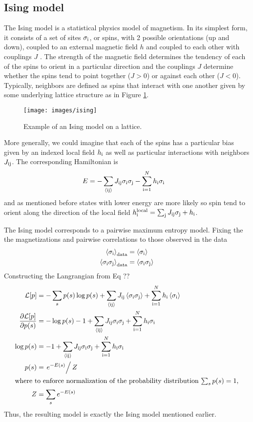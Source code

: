 \documentclass[aps,prl,twocolumn]{revtex4-1}
\begin{document}
\subsection{Ising model}
The Ising model is a statistical physics model of magnetism. In its simplest form, it consists of a set of sites $\sigma_{\rm i}$, or spins, with 2 possible orientations (up and down), coupled to an external magnetic field $h$ and coupled to each other with couplings $J$ \cite{Reif:2009uf}. The strength of the magnetic field determines the tendency of each of the spins to orient in a particular direction and the couplings $J$ determine whether the spins tend to point together ($J>0$) or against each other ($J<0$). Typically, neighbors are defined as spins that interact with one another given by some underlying lattice structure as in Figure \ref{gr:ising}.

\begin{figure}[htbp]\centering
	\texttt{[image: images/ising]}
\caption{Example of an Ising model on a lattice.}
\label{gr:ising}
\end{figure}

More generally, we could imagine that each of the spins has a particular bias given by an indexed local field $h_{\rm i}$ as well as particular interactions with neighbors $J_{\rm ij}$. The corresponding Hamiltonian is
\begin{align}
	E &= -\sum_{\rm \left<ij\right>} J_{\rm ij}\sigma_{\rm i}\sigma_{\rm j} -\sum_{\rm i=1}^Nh_{\rm i}\sigma_{\rm i}
\end{align}
and as mentioned before states with lower energy are more likely so spin tend to orient along the direction of the local field $h_{\rm i}^{\rm local} = \sum_{\rm j}J_{\rm ij}\sigma_{\rm j} +h_{\rm i}$. 

The Ising model corresponds to a pairwise maximum entropy model.
Fixing the the magnetizations and pairwise correlations to those observed in the data
\begin{align}
	\left<\sigma_{\rm i}\right>_{\rm data} &= \left<\sigma_{\rm i}\right>\\
	\left<\sigma_{\rm i}\sigma_{\rm j}\right>_{\rm data} &= \left<\sigma_{\rm i}\sigma_{\rm j}\right>
\end{align}
Constructing the Langrangian from Eq ??
\begin{align}
	\mathcal{L}[p] &= -\sum_s p(s)\log p(s) +\sum_{\rm \left<ij\right>} J_{\rm ij}\left<\sigma_{\rm i}\sigma_{\rm j}\right> +\sum_{\rm i=1}^Nh_{\rm i}\left<\sigma_{\rm i}\right>\\
	\frac{\partial\mathcal{L}[p]}{\partial p(s)} &= -\log p(s)-1 +\sum_{\rm \left<ij\right>} J_{\rm ij}\sigma_{\rm i}\sigma_{\rm j} +\sum_{\rm i=1}^Nh_{\rm i}\sigma_{\rm i}\\
	\log p(s) &= -1 +\sum_{\rm \left<ij\right>} J_{\rm ij}\sigma_{\rm i}\sigma_{\rm j} +\sum_{\rm i=1}^Nh_{\rm i}\sigma_{\rm i}\\
	p(s) &= \left.e^{-E(s)}\right/Z\\
\intertext{where to enforce normalization of the probability distribution $\sum_s p(s) = 1$,}
	Z &= \sum_s e^{-E(s)}
\end{align}
Thus, the resulting model is exactly the Ising model mentioned earlier.
\end{document}
